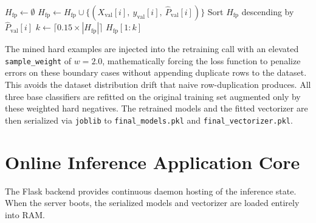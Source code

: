 \begin{algorithm}[h]
\caption{False-Positive-Driven Hard Negative Mining}\label{alg:hnm}
\begin{algorithmic}[1]
    \State $H_{\text{fp}} \gets \emptyset$
            \State $H_{\text{fp}} \gets H_{\text{fp}} \cup \{(X_{\text{val}}[i],\ y_{\text{val}}[i],\ \hat{P}_{\text{val}}[i])\}$
        \EndIf
    \EndFor
    \State Sort $H_{\text{fp}}$ descending by $\hat{P}_{\text{val}}[i]$
    \State $k \gets \lceil 0.15 \times |H_{\text{fp}}| \rceil$ 
    \State \Return $H_{\text{fp}}[1:k]$
\EndProcedure
\end{algorithmic}
\end{algorithm}

The mined hard examples are injected into the retraining call with an elevated \texttt{sample\_weight} of $w=2.0$, mathematically forcing the loss function to penalize errors on these boundary cases without appending duplicate rows to the dataset. This avoids the dataset distribution drift that naive row-duplication produces. All three base classifiers are refitted on the original training set augmented only by these weighted hard negatives. The retrained models and the fitted vectorizer are then serialized via \texttt{joblib} to \texttt{final\_models.pkl} and \texttt{final\_vectorizer.pkl}.

\section{Online Inference Application Core}
The Flask backend provides continuous daemon hosting of the inference state.
When the server boots, the serialized models and vectorizer are loaded entirely into RAM.

